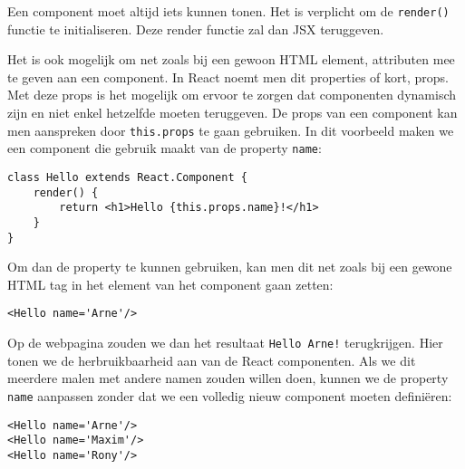 Een component moet altijd iets kunnen tonen. Het is verplicht om de \lstinline[basicstyle=\ttfamily\color{red}]|render()| functie te initialiseren. Deze render functie zal dan JSX teruggeven.

Het is ook mogelijk om net zoals bij een gewoon HTML element, attributen mee te geven aan een component. In React noemt men dit properties of kort, props. Met deze props is het mogelijk om ervoor te zorgen dat componenten dynamisch zijn en niet enkel hetzelfde moeten teruggeven. De props van een component kan men aanspreken door \lstinline[basicstyle=\ttfamily\color{red}]|this.props| te gaan gebruiken. In dit voorbeeld maken we een component die gebruik maakt van de property \lstinline[basicstyle=\ttfamily\color{red}]|name|:

\begin{lstlisting}[frame=single, caption=Het component Hello wordt gedefinieerd die de property 'name' gebruikt]
class Hello extends React.Component {
	render() {
		return <h1>Hello {this.props.name}!</h1>
	}
}
\end{lstlisting}

Om dan de property te kunnen gebruiken, kan men dit net zoals bij een gewone HTML tag in het element van het component gaan zetten:

\begin{lstlisting}[frame=single, caption=Het component Hello met de property name]
<Hello name='Arne'/>
\end{lstlisting}

Op de webpagina zouden we dan het resultaat \lstinline[basicstyle=\ttfamily\color{red}]|Hello Arne!| terugkrijgen. Hier tonen we de herbruikbaarheid aan van de React componenten. Als we dit meerdere malen met andere namen zouden willen doen, kunnen we de property \lstinline[basicstyle=\ttfamily\color{red}]|name| aanpassen zonder dat we een volledig nieuw component moeten definiëren:

\begin{lstlisting}[frame=single, caption=Het component Hello die meerdere malen met andere props wordt gebruikt.]
<Hello name='Arne'/>
<Hello name='Maxim'/>
<Hello name='Rony'/>
\end{lstlisting}


